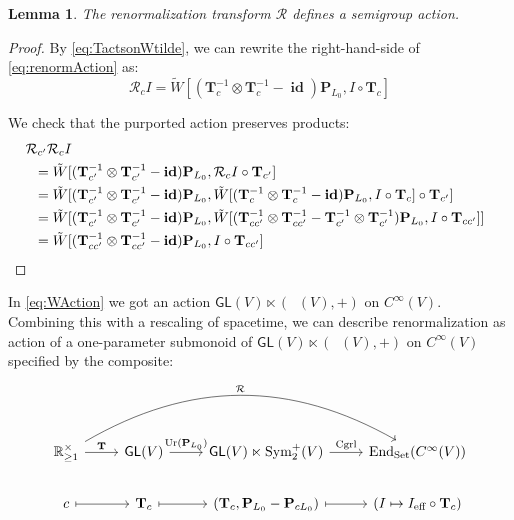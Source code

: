 \documentclass[12pt]{article}
\newcounter{counter}
\theoremstyle{definition}
\theoremstyle{plain}
\newtheorem{lem}[counter]{Lemma}
\newcommand{\Symp}{\mathop{\mathrm{Sym}_2^+}}
\newcommand{\id}{\mathop{\mathbf{id}}\nolimits}
\begin{document}
\begin{lem}
The renormalization transform $\mathcal{R}$ defines a semigroup action.
\end{lem}
    
\begin{proof}
By \autoref{eq:TactsonWtilde}, we can rewrite the right-hand-side of \autoref{eq:renormAction} as:
\begin{equation}
    \mathcal{R}_c I
    = \tilde{W}[(\mathbf{T}_c^{-1} \otimes \mathbf{T}_c^{-1} - \id) \mathbf{P}_{L_0}, I \circ \mathbf{T}_c]
\end{equation}

We check that the purported action preserves products:
\begin{align}
    &\hskip -6pt \mathcal{R}_{c'} \mathcal{R}_{c} I \\
    &= \tilde{W}[(\mathbf{T}_{c'}^{-1} \otimes \mathbf{T}_{c'}^{-1} - \id) \mathbf{P}_{L_0}, \mathcal{R}_{c} I \circ \mathbf{T}_{c'}]\\
    &= \tilde{W}[(\mathbf{T}_{c'}^{-1} \otimes \mathbf{T}_{c'}^{-1} - \id) \mathbf{P}_{L_0}, \tilde{W}[(\mathbf{T}_c^{-1} \otimes \mathbf{T}_c^{-1} - \id) \mathbf{P}_{L_0}, I \circ \mathbf{T}_c] \circ \mathbf{T}_{c'}] \\
    &= \tilde{W}[(\mathbf{T}_{c'}^{-1} \otimes \mathbf{T}_{c'}^{-1} - \id) \mathbf{P}_{L_0}, \tilde{W}[(\mathbf{T}_{cc'}^{-1} \otimes \mathbf{T}_{cc'}^{-1} - \mathbf{T}_{c'}^{-1} \otimes \mathbf{T}_{c'}^{-1}) \mathbf{P}_{L_0}, I \circ \mathbf{T}_{cc'}]] \\
    &= \tilde{W}[(\mathbf{T}_{cc'}^{-1} \otimes \mathbf{T}_{cc'}^{-1} - \id) \mathbf{P}_{L_0}, I \circ \mathbf{T}_{cc'}]
\end{align}
\end{proof}

In \autoref{eq:WAction} we got an action \(\mathsf{GL} (V) \ltimes (\Symp (V), +)\) on \(C^{\infty} (V)\). Combining this with a rescaling of spacetime, we can describe renormalization as action of a one-parameter submonoid of \(\mathsf{GL} (V) \ltimes (\Symp (V), +)\) on \(C^{\infty} (V)\) specified by the composite:
\begin{equation} \label{eq:RenormSummary}
\begin{tikzcd}
    \mathbb{R}^\times_{\ge 1} \ar[r,"\mathbf{T}"] \ar[rrr, bend left, "\mathcal{R}"] & \mathsf{GL}(V) \ar[r, "\mathop{\mathrm{Ur}} (\mathbf{P}_{L_0})"] & \mathsf{GL}(V) \ltimes \Symp (V) \ar[r, "\mathop{\mathrm{Cgrl}}"] & \mathrm{End}_{\text{Set}}(C^\infty (V))\\
    c \ar[r, mapsto] & \mathbf{T}_c \ar[r, mapsto] & (\mathbf{T}_c, \mathbf{P}_{L_0} - \mathbf{P}_{cL_0}) \ar[r, mapsto] & (I\mapsto I_\text{eff} \circ \mathbf{T} _c)
\end{tikzcd}
\end{equation}
 
\end{document}
